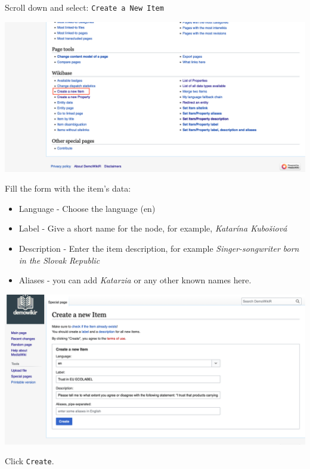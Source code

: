 \documentclass[
  letterpaper,
  DIV=11,
  numbers=noendperiod]{scrreprt}
\begin{document}
Scroll down and select: \texttt{Create\ a\ New\ Item}

\begin{center}
\includegraphics{png/question_to_wikibase/wikibase_addNewItem_2x1.png}
\end{center}

Fill the form with the item's data:

\begin{itemize}
\item
  Language - Choose the language (en)
\item
  Label - Give a short name for the node, for example, \emph{Katarína
  Kubošiová}
\item
  Description - Enter the item description, for example
  \emph{Singer-songwriter born in the Slovak Republic}
\item
  Aliases - you can add \emph{Katarzia} or any other known names here.
\end{itemize}

\begin{center}
\includegraphics{png/question_to_wikibase/wikibase_createNewItem_2x1.png}
\end{center}

Click \texttt{Create}.
\end{document}
